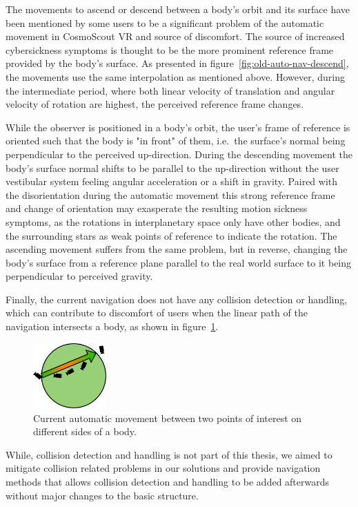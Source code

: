 The movements to ascend or descend between a body's orbit and its surface have been mentioned by some users to be a
significant problem of the automatic movement in CosmoScout VR and source of discomfort.
The source of increased cybersickness symptoms is thought to be the more prominent reference frame provided by the
body's surface.
As presented in figure~\ref{fig:old-auto-nav-descend}, the movements use the same interpolation as mentioned above.
However, during the intermediate period, where both linear velocity of translation and angular velocity of rotation
are highest, the perceived reference frame changes.

While the observer is positioned in a body's orbit, the user's frame of reference is oriented such that the body is
"in front" of them, i.e.\ the surface's normal being perpendicular to the perceived up-direction.
During the descending movement the body's surface normal shifts to be parallel to the up-direction without the user
vestibular system feeling angular acceleration or a shift in gravity.
Paired with the disorientation during the automatic movement this strong reference frame and change of orientation may
exasperate the resulting motion sickness symptoms, as the rotations in interplanetary space only have other bodies,
and the surrounding stars as weak points of reference to indicate the rotation.
The ascending movement suffers from the same problem, but in reverse, changing the body's surface from a reference
plane parallel to the real world surface to it being perpendicular to perceived gravity.

Finally, the current navigation does not have any collision detection or handling, which can contribute to discomfort
of users when the linear path of the navigation intersects a body, as shown in figure~\ref{fig:old-auto-nav-collision}.

\begin{figure}[h]
    \centering
    \includegraphics[width=0.25\textwidth]{content/3_current_state/img/OldAutomaticNavigation_SurfaceCollision}
    \caption{Current automatic movement between two points of interest on different sides of a body.}
    \label{fig:old-auto-nav-collision}
\end{figure}

While, collision detection and handling is not part of this thesis, we aimed to mitigate collision related problems in
our solutions and provide navigation methods that allows collision detection and handling to be added afterwards
without major changes to the basic structure.
